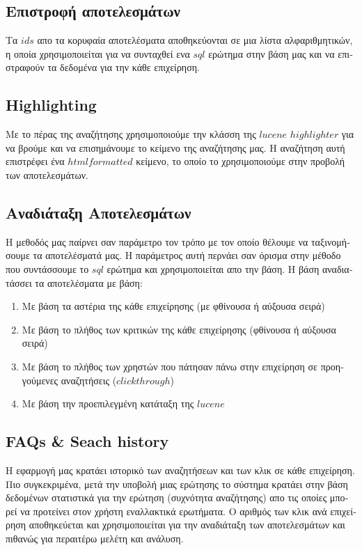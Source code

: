 \subsection{\textgreek{Επιστροφή αποτελεσμάτων}}
\textgreek{
Τα $ids$ απο τα κορυφαία αποτελέσματα αποθηκεύονται σε μια λίστα αλφαριθμητικών, η οποία χρησιμοποιείται για να συνταχθεί
ενα $sql$ ερώτημα στην βάση μας και να επιστραφούν τα δεδομένα για την κάθε επιχείρηση.
}

\subsection{Highlighting}
\textgreek{
Με το πέρας της αναζήτησης χρησιμοποιούμε την κλάσση της $lucene$ $highlighter$ για να βρούμε και να
επισημάνουμε το κείμενο της αναζήτησης μας.
Η αναζήτηση αυτή επιστρέφει ένα $html formatted$ κείμενο, το οποίο το χρησιμοποιούμε στην προβολή των αποτελεσμάτων.
}

\subsection{\textgreek{Αναδιάταξη Αποτελεσμάτων}}
\textgreek{
Η μεθοδός μας παίρνει σαν παράμετρο τον τρόπο με τον οποίο θέλουμε να ταξινομήσουμε τα αποτελέσματά μας.
Η παράμετρος αυτή περνάει σαν όρισμα στην μέθοδο που συντάσσουμε το $sql$ ερώτημα και χρησιμοποιείται απο την βάση.
Η βάση αναδιατάσσει τα αποτελέσματα με βάση:
}
\begin{enumerate}
    \item\textgreek{ Με βάση τα αστέρια της κάθε επιχείρησης (με φθίνουσα ή αύξουσα σειρά)}
    \item\textgreek{ Με βάση το πλήθος των κριτικών της κάθε επιχείρησης (φθίνουσα ή αύξουσα σειρά)}
    \item\textgreek{ Με βάση το πλήθος των χρηστών που πάτησαν πάνω στην επιχείρηση σε προηγούμενες αναζητήσεις ($clickthrough$)}
    \item\textgreek{ Με βάση την προεπιλεγμένη κατάταξη της $lucene$ }
\end{enumerate}

\subsection{FAQs \& Seach history}
\textgreek{
Η εφαρμογή μας κρατάει ιστορικό των αναζητήσεων και των κλικ σε κάθε επιχείρηση. Πιο συγκεκριμένα, μετά την υποβολή μιας
ερώτησης το σύστημα κρατάει στην βάση δεδομένων στατιστικά για την ερώτηση (συχνότητα αναζήτησης) απο τις οποίες μπορεί
να προτείνει στον χρήστη εναλλακτικά ερωτήματα. Ο αριθμός των κλικ ανά επιχείρηση αποθηκεύεται και χρησιμοποιείται για
την αναδιάταξη των αποτελεσμάτων και πιθανώς για περαιτέρω μελέτη και ανάλυση.
}
